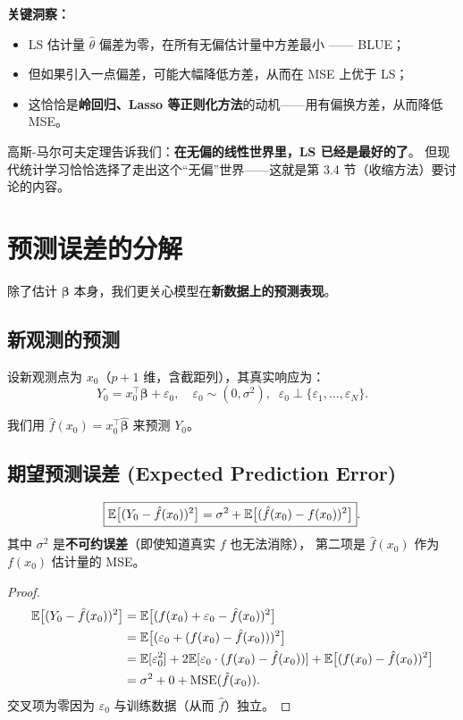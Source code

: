 \textbf{关键洞察：}
\begin{itemize}
    \item LS 估计量 $\hat{\theta}$ 偏差为零，在所有无偏估计量中方差最小 —— BLUE；
    \item 但如果引入一点偏差，可能大幅降低方差，从而在 MSE 上优于 LS；
    \item 这恰恰是\textbf{岭回归、Lasso 等正则化方法}的动机——用有偏换方差，从而降低 MSE。
\end{itemize}

高斯-马尔可夫定理告诉我们：\textbf{在无偏的线性世界里，LS 已经是最好的了}。
但现代统计学习恰恰选择了走出这个``无偏''世界——这就是第 3.4 节（收缩方法）要讨论的内容。

\section{预测误差的分解}

除了估计 $\bm{\beta}$ 本身，我们更关心模型在\textbf{新数据上的预测表现}。

\subsection{新观测的预测}

设新观测点为 $x_0$（$p+1$ 维，含截距列），其真实响应为：
\[
    Y_0 = x_0^\top \bm{\beta} + \varepsilon_0,
    \quad \varepsilon_0 \sim (0, \sigma^2),\;\; \varepsilon_0 \perp \{\varepsilon_1,\dots,\varepsilon_N\}.
\]

我们用 $\hat{f}(x_0) = x_0^\top \hat{\bm{\beta}}$ 来预测 $Y_0$。

\subsection{期望预测误差 (Expected Prediction Error)}

\begin{theorem}[新点上的预测误差分解]
\begin{equation}\label{eq:pred_error}
    \boxed{\mathbb{E}\big[(Y_0 - \hat{f}(x_0))^2\big]
    = \sigma^2 + \mathbb{E}\big[(\hat{f}(x_0) - f(x_0))^2\big]}.
\end{equation}
其中 $\sigma^2$ 是\textbf{不可约误差}（即使知道真实 $f$ 也无法消除），
第二项是 $\hat{f}(x_0)$ 作为 $f(x_0)$ 估计量的 MSE。
\end{theorem}

\begin{proof}
\begin{align}
    \mathbb{E}\big[(Y_0 - \hat{f}(x_0))^2\big]
    &= \mathbb{E}\big[(f(x_0) + \varepsilon_0 - \hat{f}(x_0))^2\big] \nonumber\\
    &= \mathbb{E}\big[(\varepsilon_0 + (f(x_0) - \hat{f}(x_0)))^2\big] \nonumber\\
    &= \mathbb{E}[\varepsilon_0^2] + 2\mathbb{E}[\varepsilon_0 \cdot (f(x_0) - \hat{f}(x_0))]
       + \mathbb{E}\big[(f(x_0) - \hat{f}(x_0))^2\big] \nonumber\\
    &= \sigma^2 + 0 + \mathrm{MSE}(\hat{f}(x_0)).
\end{align}
交叉项为零因为 $\varepsilon_0$ 与训练数据（从而 $\hat{f}$）独立。
\end{proof}

